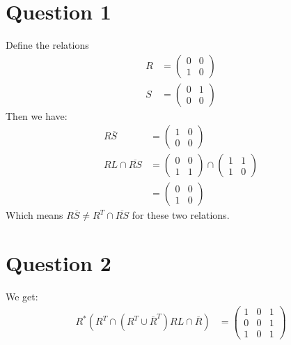 \documentclass[a4paper, fleqn]{article}
\begin{document}
\section*{Question 1}
Define the relations
\begin{align*}
R &=
\begin{pmatrix}
  0 & 0 \\
  1 & 0
\end{pmatrix} \\
S &=
\begin{pmatrix}
  0 & 1 \\
  0 & 0
\end{pmatrix}
\end{align*}
Then we have:
\begin{align*}
R\overline{S} &=
\begin{pmatrix}
  1 & 0 \\
  0 & 0
\end{pmatrix} \\
RL \cap \overline{RS} &=
\begin{pmatrix}
  0 & 0 \\
  1 & 1
\end{pmatrix} \cap
\begin{pmatrix}
  1 & 1 \\
  1 & 0
\end{pmatrix} \\
&=
\begin{pmatrix}
  0 & 0 \\
  1 & 0
\end{pmatrix}
\end{align*}
Which means $R\overline{S}\neq R^T \cap \overline{RS}$ for these two relations.

\section*{Question 2}
We get:
\begin{align*}
  R^*(R^T\cap (R^T \cup \overline{R}^T)RL \cap \overline{R}) &=
  \begin{pmatrix}
    1 & 0 & 1 \\
    0 & 0 & 1 \\
    1 & 0 & 1
  \end{pmatrix}
\end{align*}
\end{document}
